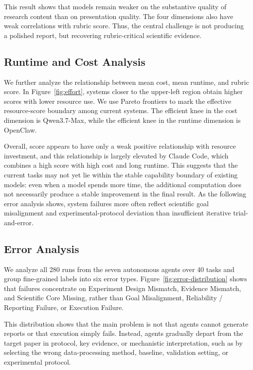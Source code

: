 This result shows that models remain weaker on the substantive quality of research content than on presentation quality. The four dimensions also have weak correlations with rubric score. Thus, the central challenge is not producing a polished report, but recovering rubric-critical scientific evidence.

\subsection{Runtime and Cost Analysis}

We further analyze the relationship between mean cost, mean runtime, and rubric score. In Figure~\ref{fig:effort}, systems closer to the upper-left region obtain higher scores with lower resource use. We use Pareto frontiers to mark the effective resource-score boundary among current systems. The efficient knee in the cost dimension is Qwen3.7-Max, while the efficient knee in the runtime dimension is OpenClaw.

Overall, score appears to have only a weak positive relationship with resource investment, and this relationship is largely elevated by Claude Code, which combines a high score with high cost and long runtime. This suggests that the current tasks may not yet lie within the stable capability boundary of existing models: even when a model spends more time, the additional computation does not necessarily produce a stable improvement in the final result. As the following error analysis shows, system failures more often reflect scientific goal misalignment and experimental-protocol deviation than insufficient iterative trial-and-error.

\subsection{Error Analysis}

We analyze all 280 runs from the seven autonomous agents over 40 tasks and group fine-grained labels into six error types. Figure~\ref{fig:error-distribution} shows that failures concentrate on Experiment Design Mismatch, Evidence Mismatch, and Scientific Core Missing, rather than Goal Misalignment, Reliability / Reporting Failure, or Execution Failure.

This distribution shows that the main problem is not that agents cannot generate reports or that execution simply fails. Instead, agents gradually depart from the target paper in protocol, key evidence, or mechanistic interpretation, such as by selecting the wrong data-processing method, baseline, validation setting, or experimental protocol.

